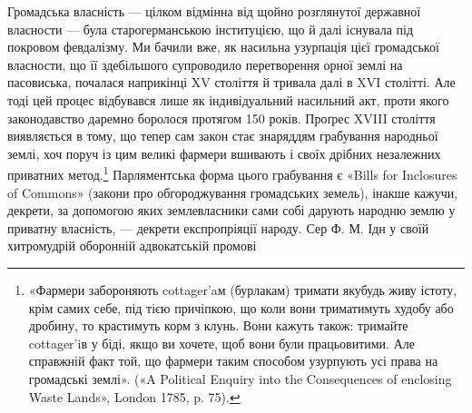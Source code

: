 Громадська власність — цілком відмінна від щойно розглянутої
державної власности — була старогерманською інституцією,
що й далі існувала під покровом февдалізму. Ми бачили
вже, як насильна узурпація цієї громадської власности, що її
здебільшого супроводило перетворення орної землі на пасовиська,
почалася наприкінці XV століття й тривала далі в XVI столітті.
Але тоді цей процес відбувався лише як індивідуальний
насильний акт, проти якого законодавство даремно боролося протягом
150 років. Проґрес XVIII століття виявляється в тому,
що тепер сам закон стає знаряддям грабування народньої землі,
хоч поруч із цим великі фармери вшивають і своїх дрібних незалежних
приватних метод.\footnote{
«Фармери забороняють cottager’aм (бурлакам) тримати якубудь
живу істоту, крім самих себе, під тією причіпкою, що коли вони триматимуть
худобу або дробину, то крастимуть корм з клунь. Вони кажуть
також: тримайте cottager’iв у біді, якщо ви хочете, щоб вони були працьовитими.
Але справжній факт той, що фармери таким способом узурпують
усі права на громадські землі». («A Political Enquiry into the Consequences
of enclosing Waste Lands», London 1785, p. 75).
} Парляментська форма цього грабування
є «Bills for Inclosures of Commons» (закони про обгороджування
громадських земель), інакше кажучи, декрети, за допомогою
яких землевласники сами собі дарують народню землю
у приватну власність, — декрети експропріяції народу. Сер Ф. М.
Ідн у своїй хитромудрій оборонній адвокатській промові
\parbreak{}  %
